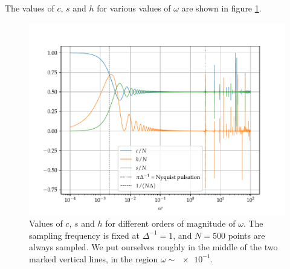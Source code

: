 \documentclass[main.tex]{subfiles}
\begin{document}
The values of \(c\), \(s\) and \(h\) for various values of \(\omega \) are shown in figure \ref{fig:large_pulsation}.

\begin{figure}[ht]
\centering
\includegraphics[width=\textwidth]{figures/large_pulsation}
\caption{Values of \(c\), \(s\) and \(h\) for different orders of magnitude of \(\omega \). The sampling frequency is fixed at \(\Delta^{-1} = 1\), and \(N=500\) points are always sampled. We put ourselves roughly in the middle of the two marked vertical lines, in the region \(\omega \sim \num{e-1}\).} 
\label{fig:large_pulsation}
\end{figure}


\end{document}
